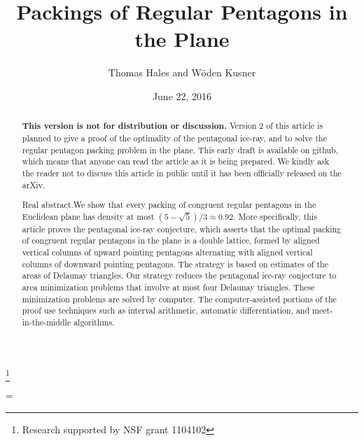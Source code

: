 \documentclass{amsart}
\theoremstyle{plain}
\theoremstyle{definition}
\theoremstyle{remark}
\begin{document}
\title
    {Packings of Regular Pentagons in the Plane}
\author{Thomas Hales and W\"oden Kusner}
\date{June 22, 2016}
\thanks{Research supported by NSF grant 1104102}

\begin{abstract}  
{\bf This version is not for distribution or discussion.}
Version 2 of this article is planned to give a proof of the optimality of the pentagonal ice-ray,
and to solve the regular pentagon packing problem in the plane.  This early draft is available on
github, which means that anyone can read the article as it is being prepared.  We kindly ask
the reader not to discuss this article in public until it has been officially released on the arXiv.

{\sc Real abstract.}\quad We show that every packing of congruent regular pentagons in the Euclidean plane has
density at most $(5-\sqrt5)/3\approx 0.92$.     More specifically,
this article proves the pentagonal ice-ray
conjecture, which asserts that the optimal packing of congruent regular pentagons in the plane is a double lattice,
formed by aligned vertical columns of upward pointing pentagons alternating
with aligned vertical columns of downward pointing pentagons.  The strategy is based on estimates
of the areas of Delaunay triangles.  Our strategy reduces the pentagonal ice-ray conjecture to
area minimization problems that involve at most four Delaunay triangles.  These minimization problems
are solved by computer.  The computer-assisted portions of the proof use techniques such as
interval arithmetic, automatic differentiation, and meet-in-the-middle algorithms.
\end{abstract}


\parskip=\baselineskip

 \maketitle



    

      
      
       
%
      
      
%





%
\end{document}
